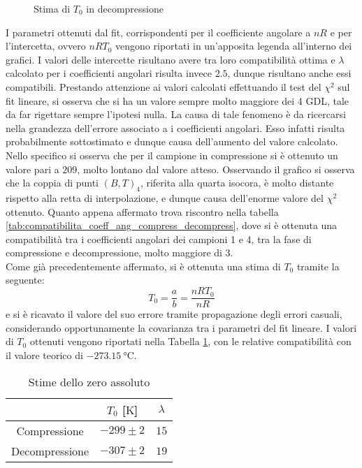 \documentclass[a4paper,11pt,oneside]{article}
\begin{document}
\begin{figure}[h!]
    \centering
    \caption{Stima di $T_0$ in decompressione}
    \label{fig:t0_decompressione}
\end{figure}
I parametri ottenuti dal fit, corrispondenti per il coefficiente angolare a $n R$ e per l'intercetta, ovvero $n R T_0$  vengono riportati in un'apposita legenda all'interno dei grafici. I valori delle intercette risultano avere tra loro compatibilità ottima e $\lambda$ calcolato per i coefficienti angolari risulta invece $2.5$, dunque risultano anche essi compatibili. Prestando attenzione ai valori calcolati effettuando il test del $\chi^2$ sul fit lineare, si osserva che si ha un valore sempre molto maggiore dei 4 GDL, tale da far rigettare sempre l'ipotesi nulla. La causa di tale fenomeno è da ricercarsi nella grandezza dell'errore associato a i coefficienti angolari. Esso infatti risulta probabilmente sottostimato e dunque causa dell'aumento del valore calcolato.  Nello specifico si osserva che per il campione in compressione si è ottenuto un valore pari a $209$, molto lontano dal valore atteso.
Osservando il grafico si osserva che la coppia di punti $(B,T)_4$, riferita alla quarta isocora, è molto distante rispetto alla retta di interpolazione, e dunque causa dell'enorme valore del $\chi^2$ ottenuto. Quanto appena affermato trova riscontro nella tabella \ref{tab:compatibilita_coeff_ang_compress_decompress}, dove si è ottenuta una compatibilità tra i coefficienti angolari dei campioni 1 e 4, tra la fase di compressione e decompressione, molto maggiore di $3$.\\
Come già precedentemente affermato, si è ottenuta una stima di $T_0$ tramite la seguente:
\begin{equation*}
    T_0=\frac{a}{b}=\frac{n R  T_0} {n R}
\end{equation*}
e si è ricavato il valore del suo errore tramite propagazione degli errori casuali, considerando opportunamente la covarianza tra i parametri del fit lineare.
I valori di $T_0$ ottenuti vengono riportati nella Tabella \ref{tab:zero_ass}, con le relative compatibilità con il valore teorico di $\SI{-273.15}{\celsius}$.

\begin{table}[h!]
    \centering
    \begin{tabular}{|c|c|c|}
        \hline
        & $T_{0}$ [$\si{\kelvin}$] & $\lambda$\\ \hline
        \rowcolor[rgb]{0.85,0.85,0.85}Compressione & $-299\pm2$ & $15$\\ \hline
        Decompressione & $-307\pm2$ & $19$\\ \hline
    \end{tabular}
    \caption{Stime dello zero assoluto}
    \label{tab:zero_ass}
\end{table}
\end{document}
